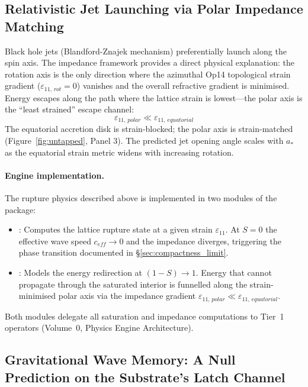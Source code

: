 \subsection{Relativistic Jet Launching via Polar Impedance Matching}

Black hole jets (Blandford-Znajek mechanism) preferentially launch along the spin axis. The impedance framework provides a direct physical explanation: the rotation axis is the only direction where the azimuthal Op14 topological strain gradient ($\varepsilon_{11,\,rot} = 0$) vanishes and the overall refractive gradient is minimised. Energy escapes along the path where the lattice strain is lowest---the polar axis is the ``least strained'' escape channel:
\begin{equation}
    \varepsilon_{11,\,polar} \ll \varepsilon_{11,\,equatorial}
\end{equation}
The equatorial accretion disk is strain-blocked; the polar axis is strain-matched (Figure~\ref{fig:untapped}, Panel 3). The predicted jet opening angle scales with $a_*$ as the equatorial strain metric widens with increasing rotation.

\paragraph{Engine implementation.}
The rupture physics described above is implemented in two modules of the  package:
\begin{itemize}
    \item {}: Computes the lattice rupture state
          at a given strain $\varepsilon_{11}$.  At $S = 0$ the effective
          wave speed $c_{eff} \to 0$ and the impedance diverges, triggering
          the phase transition documented in \S\ref{sec:compactness_limit}.
    \item {}: Models the energy redirection
          at $(1-S) \to 1$.  Energy that cannot propagate through the
          saturated interior is funnelled along the strain-minimised polar
          axis via the impedance gradient $\varepsilon_{11,\,polar} \ll \varepsilon_{11,\,equatorial}$.
\end{itemize}
Both modules delegate all saturation and impedance computations to Tier~1 operators (Volume~0, Physics Engine Architecture).

\subsection{Gravitational Wave Memory: A Null Prediction on the Substrate's Latch Channel}

